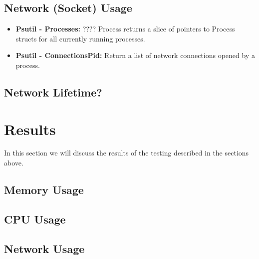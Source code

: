 \documentclass[USenglish]{uit-thesis}
\begin{document}
\subsection{Network (Socket) Usage} \label{eva:net_measure}




\begin{itemize}
\item \textbf{Psutil - Processes:} ???? Process returns a slice of pointers to Process structs for all currently running processes.
\item \textbf{Psutil - ConnectionsPid:} Return a list of network connections opened by a process.
\end{itemize}



\subsection{Network Lifetime?}


\section{Results}
In this section we will discuss the results of the testing described in the sections above.

\subsection{Memory Usage}
\subsection{CPU Usage}
\subsection{Network Usage}
\end{document}
